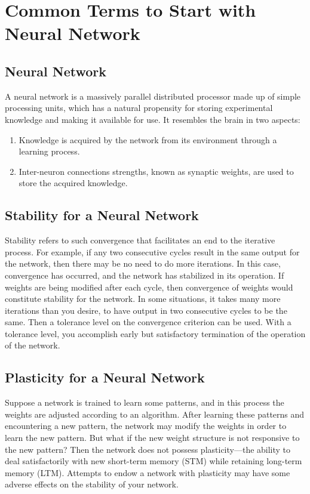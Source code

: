 \chapter{Common Terms to Start with Neural Network}
\section{Neural Network}
A neural network is a massively parallel distributed processor made up of simple processing units, which has a natural propensity for storing experimental knowledge and making it available for use. It resembles the brain in two aspects:
\begin{enumerate}
\item Knowledge is acquired by the network from its environment through a learning process.
\item Inter-neuron connections strengths, known as synaptic weights, are used to store the acquired knowledge. 
\end{enumerate} 
\section{Stability for a Neural Network}
Stability refers to such convergence that facilitates an end to the iterative
process. For example, if any two consecutive cycles result in the same output
for the network, then there may be no need to do more iterations. In this case,
convergence has occurred, and the network has stabilized in its operation. If
weights are being modified after each cycle, then convergence of weights
would constitute stability for the network.
In some situations, it takes many more iterations than you desire, to have
output in two consecutive cycles to be the same. Then a tolerance level on the
convergence criterion can be used. With a tolerance level, you accomplish
early but satisfactory termination of the operation of the network.

\section{Plasticity for a Neural Network}
Suppose a network is trained to learn some patterns, and in this process the
weights are adjusted according to an algorithm. After learning these patterns
and encountering a new pattern, the network may modify the weights in order
to learn the new pattern. But what if the new weight structure is not responsive
to the new pattern? Then the network does not possess plasticity—the ability
to deal satisfactorily with new short-term memory (STM) while retaining
long-term memory (LTM). Attempts to endow a network with plasticity may
have some adverse effects on the stability of your network.

